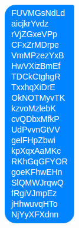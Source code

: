 \begin{figure}[h]
\centering
 \begin{subfigure}[b]{0.15\textwidth}
\includegraphics[width=\textwidth]{figures/messenger_string}

\end{subfigure}
\end{figure}

